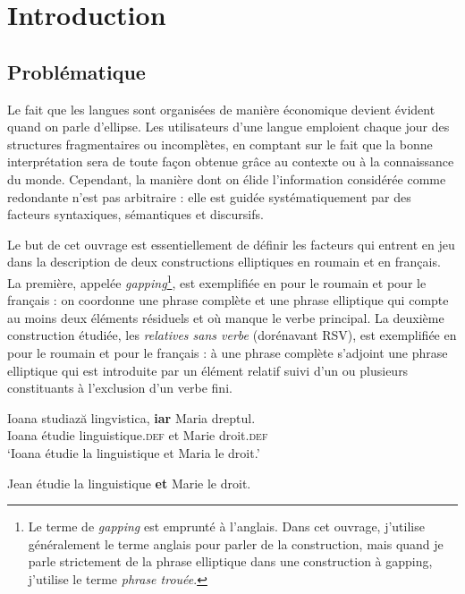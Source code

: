 \chapter{Introduction}

\section{Problématique}



Le fait que les langues sont organisées de manière économique devient évident quand on parle d’ellipse. Les utilisateurs d’une langue emploient chaque jour des structures fragmentaires ou incomplètes, en comptant sur le fait que la bonne interprétation sera de toute façon obtenue grâce au contexte ou à la connaissance du monde. Cependant, la manière dont on élide l’information considérée comme redondante n’est pas arbitraire : elle est guidée systématiquement par des facteurs syntaxiques, sémantiques et discursifs. 



Le but de cet ouvrage est essentiellement de définir les facteurs qui entrent en jeu dans la description de deux constructions elliptiques en roumain et en français. La première, appelée \textit{gapping}\footnote{{}  Le terme de \textit{gapping} est emprunté à l’anglais. Dans cet ouvrage, j’utilise généralement le terme anglais pour parler de la construction, mais quand je parle strictement de la phrase elliptique dans une construction à gapping, j’utilise le terme \textit{phrase trouée}.}, est exemplifiée en  pour le roumain et  pour le français : on coordonne une phrase complète et une phrase elliptique qui compte au moins deux éléments résiduels et où manque le verbe principal. La deuxième construction étudiée, les \textit{relatives sans verbe} (dorénavant RSV), est exemplifiée en  pour le roumain et  pour le français : à une phrase complète s’adjoint une phrase elliptique qui est introduite par un élément relatif suivi d’un ou plusieurs constituants à l’exclusion d’un verbe fini. 


\ea \label{ch0:ex1}
\ea
\gll Ioana studiază lingvistica,  {\ob}\textbf{iar}  Maria  dreptul{\cb}.    \label{ch0:ex1a}\\ 
Ioana  étudie  linguistique.\textsc{def}  et  Marie  droit\textsc{.def} \\
\glt ‘Ioana étudie la linguistique et Maria le droit.’

\ex
 Jean étudie la linguistique {\ob}\textbf{et} Marie le droit{\cb}.     \\ \label{ch0:ex1b}
\z
\z


